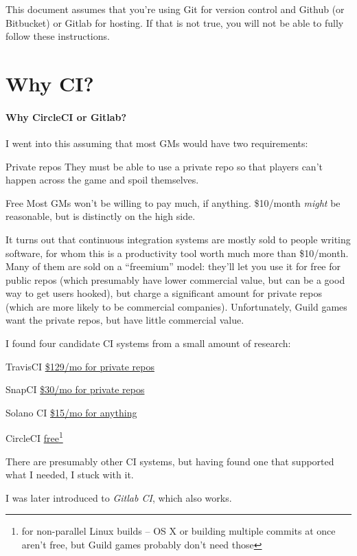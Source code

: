\documentclass[green]{testgame}
\begin{document}
\newcommand{\ter}[1]{\fbox{\parbox{6.5in}{{\tt #1}}}}
\newcommand{\GameTeX}{GameTeX}
\newcommand{\webbase}{http://web.mit.edu/adehnert/Public/assassin/docs}


This document assumes that you're using Git for version control and Github (or Bitbucket) or Gitlab for hosting. If that is not true, you will not be able to fully follow these instructions.

\section{Why CI?}

\begin{WrapText}
  \paragraph*{Why CircleCI or Gitlab?} I went into this assuming that most GMs would have two requirements:
  \begin{desc}
  \item[Private repos] They must be able to use a private repo so that players can't happen across the game and spoil themselves.
  \item[Free] Most GMs won't be willing to pay much, if anything. \$10/month \emph{might} be reasonable, but is distinctly on the high side.
  \end{desc}

  It turns out that continuous integration systems are mostly sold to people writing software, for whom this is a productivity tool worth much more than \$10/month. Many of them are sold on a ``freemium'' model: they'll let you use it for free for public repos (which presumably have lower commercial value, but can be a good way to get users hooked), but charge a significant amount for private repos (which are more likely to be commercial companies). Unfortunately, Guild games want the private repos, but have little commercial value.

  I found four candidate CI systems from a small amount of research:
  \begin{desc}
  \item[TravisCI] \href{https://travis-ci.com/plans}{\$129/mo for private repos}
  \item[SnapCI] \href{https://snap-ci.com/my_plans/}{\$30/mo for private repos}
  \item[Solano CI] \href{https://www.solanolabs.com/#pricing}{\$15/mo for anything}
  \item[CircleCI] \href{https://circleci.com/pricing/}{free\footnote{for non-parallel Linux builds -- OS X or building multiple commits at once aren't free, but Guild games probably don't need those}}
  \end{desc}

  There are presumably other CI systems, but having found one that supported what I needed, I stuck with it.

  I was later introduced to \emph{Gitlab CI}, which also works.
\end{WrapText}
\end{document}
